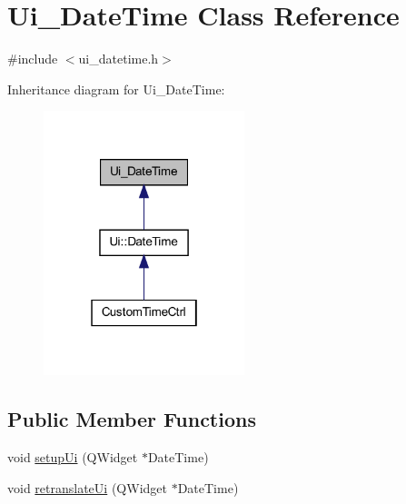 \hypertarget{class_ui___date_time}{
\section{Ui\_\-DateTime Class Reference}
\label{class_ui___date_time}
}


{\ttfamily \#include $<$ui\_\-datetime.h$>$}



Inheritance diagram for Ui\_\-DateTime:\nopagebreak
\begin{figure}[H]
\begin{center}
\leavevmode
\includegraphics[width=166pt]{class_ui___date_time__inherit__graph}
\end{center}
\end{figure}
\subsection*{Public Member Functions}
\begin{DoxyCompactItemize}
\item 
void \hyperlink{class_ui___date_time_aec460e980f671b301914cde3e3802143}{setupUi} (QWidget $\ast$DateTime)
\item 
void \hyperlink{class_ui___date_time_aa8b20acb5b090ebf9e2492f0ec58689f}{retranslateUi} (QWidget $\ast$DateTime)
\end{DoxyCompactItemize}
